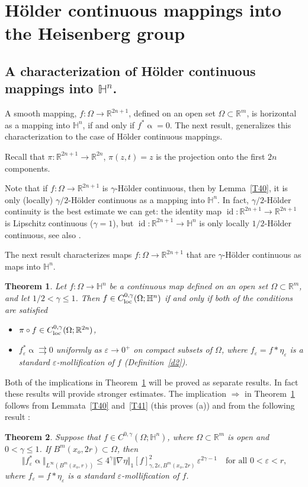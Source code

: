 \documentclass[intlimits,12pt,reqno]{amsart}
\newcommand{\bbbh}{\mathbb H}
\newcommand{\R}{\mathbb R}
\newcommand{\eps}{\varepsilon}
\numberwithin{equation}{section}
\newtheorem{theorem}{Theorem}[section]
\theoremstyle{definition}
\begin{document}
\section{H\"older continuous mappings into the Heisenberg group}
\label{HM}
\subsection{A characterization of H\"older continuous mappings into \texorpdfstring{$\bbbh^n$}{Hn}.}
\label{HM1}
A smooth mapping, $f:\Omega\to\R^{2n+1}$, defined on an open set $\Omega\subset\R^m$, is horizontal as a mapping into $\bbbh^n$, if and only if $f^*\upalpha=0$. The next result, generalizes this characterization to the case of H\"older continuous mappings.

Recall that $\pi:\R^{2n+1}\to\R^{2n}$, $\pi(z,t)=z$ is the projection onto the first $2n$ components.

Note that if $f:\Omega\to\R^{2n+1}$ is $\gamma$-H\"older continuous, then by Lemma~\ref{T40}, it is only (locally) $\gamma/2$-H\"older continuous as a mapping into $\bbbh^n$. In fact, $\gamma/2$-H\"older continuity is the best estimate we can get: the identity map $\operatorname{id}:\R^{2n+1}\to\R^{2n+1}$ is Lipschitz continuous ($\gamma=1$), but $\operatorname{id}:\R^{2n+1}\to\bbbh^n$ is only locally $1/2$-H\"older continuous, see also \cite[Proposition~3.1]{HMR}.


The next result characterizes maps $f:\Omega\to\R^{2n+1}$ that are $\gamma$-H\"older continuous as maps into $\bbbh^n$.
\begin{theorem}
\label{T64}
Let $f:\Omega\to\bbbh^n$ be a continuous map defined on an open set $\Omega\subset\R^m$, and let $1/2<\gamma\leq 1$. Then $f\in C^{0,\gamma}_{\rm loc}(\Omega;\bbbh^n)$ if and only if both of the conditions are satisfied
\begin{itemize}
\item[(a)] $\pi\circ f\in C_{\rm loc}^{0,\gamma}(\Omega;\R^{2n})$,
\item[(b)] $f^*_\eps\upalpha\rightrightarrows 0$ uniformly as $\eps\to 0^+$ on compact subsets of $\Omega$, where $f_\eps=f*\eta_\eps$ is a standard $\eps$-mollification of $f$ (Definition~\ref{d2}).
\end{itemize}
\end{theorem}
Both of the implications in Theorem~\ref{T64} will be proved as separate results. In fact these results will provide stronger estimates. The implication $\Rightarrow$ in Theorem~\ref{T64} follows from Lemmata~\ref{T40} and~\ref{T41} (this proves (a)) and from the following result \cite[Lemma~2.2]{HS23}: 
\begin{theorem}
\label{T45}
Suppose that
$f\in C^{0,\gamma}(\Omega;\bbbh^n)$, 
where  $\Omega\subset\R^m$ is open and
$0<\gamma\leq 1$.  If $B^m(x_o,2r)\subset\Omega$, then
$$
\Vert f^*_\eps\upalpha\Vert_{L^\infty(B^m(x_o,r))}\leq 
4^\gamma\Vert \nabla\eta\Vert_1[f]_{\gamma,2\eps,B^m(x_o,2r)}^2\,\eps^{2\gamma-1}
\quad
\text{for all $0<\eps<r$,}
$$
where $f_\eps=f*\eta_\eps$ is a standard $\eps$-mollification of $f$.
\end{theorem}
\end{document}
